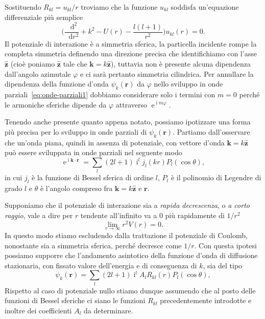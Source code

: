 \documentclass[a4paper,fleqn,twoside,12pt]{article}
\renewcommand{\phi}{\varphi}
\newcommand*{\dd}{\mathop{}\!\mathrm{d}} %
\DeclareMathOperator{\e}{\mathrm{e}} %
\DeclareMathOperator{\uimm}{\mathrm{i}} %
\newcommand*{\toder}[3][]{\frac{{\dd^{#1}}#2}{\dd {#3}^{#1}}}
\newcommand*{\versor}[1]{\hat{\bm{#1}}}
\begin{document}
Sostituendo $R_{kl}=u_{kl}/r$ troviamo che la funzione $u_{kl}$ soddisfa
un'equazione differenziale più semplice
\begin{equation}
  \label{eq:diff-u-op}
  \bigg(\toder[2]{}{r} + k^{2} - U(r) - \frac{l(l+1)}{r^{2}}\bigg)u_{kl}(r) = 0.
\end{equation}
Il potenziale di interazione è a simmetria sferica, la particella incidente
rompe la completa simmetria definendo una direzione precisa che identifichiamo
con l'asse $\versor{z}$ (cioè poniamo $\versor{z}$ tale che
$\bm{k} = k\versor{z}$), tuttavia non è presente alcuna dipendenza dall'angolo
azimutale $\phi$ e ci sarà pertanto simmetria cilindrica.  Per annullare la
dipendenza della funzione d'onda $\psi_{k}(\bm{r})$ da $\phi$ nello sviluppo in
onde parziali~\eqref{eq:onde-parziali1} dobbiamo considerare solo i termini con
$m = 0$ perché le armoniche sferiche dipende da $\phi$ attraverso
$\e^{\uimm m \phi}$.

Tenendo anche presente quanto appena notato, possiamo ipotizzare una forma più
precisa per lo sviluppo in onde parziali di $\psi_{k}(\bm{r})$.  Partiamo
dall'osservare che un'onda piana, quindi in assenza di potenziale, con vettore
d'onda $\bm{k} = k\versor{z}$ può essere sviluppata in onde parziali nel
seguente modo
\begin{equation}
  \label{eq:sviluppo-onda-piana}
  \e^{\uimm \bm{k}\cdot\bm{r}} = \sum_{l} (2l+1) \uimm^{l} j_{l}(kr)
  P_{l}(\cos\theta),
\end{equation}
in cui $j_{l}$ è la funzione di Bessel sferica di ordine $l$, $P_{l}$ è il
polinomio di Legendre di grado $l$ e $\theta$ è l'angolo compreso fra
$\bm{k} = k\versor{z}$ e $\bm{r}$.

Supponiamo che il potenziale di interazione sia a \emph{rapida decrescenza}, o
\emph{a corto raggio}, vale a dire per $r$ tendente all'infinito va a $0$ più
rapidamente di $1/r^{2}$
\begin{equation}
  \lim_{r \to \infty} r^{2}V(r) = 0.
\end{equation}
In questo modo stiamo escludendo dalla trattazione il potenziale di Coulomb,
nonostante sia a simmetria sferica, perché decresce come $1/r$.  Con questa
ipotesi possiamo supporre che l'andamento asintotico della funzione d'onda di
diffusione stazionaria, con fissato valore dell'energia e di conseguenza di $k$,
sia del tipo
\begin{equation}
  \label{eq:onde-parziali2}
  \psi_{k}(\bm{r}) = \sum_{l} (2l+1)\uimm^{l} A_{l} R_{kl}(r) P_{l}(\cos\theta),
\end{equation}
Rispetto al caso di potenziale nullo stiamo dunque assumendo che al posto delle
funzioni di Bessel sferiche ci siano le funzioni $R_{kl}$ precedentemente
introdotte e inoltre dei coefficienti $A_{l}$ da determinare.
\end{document}

